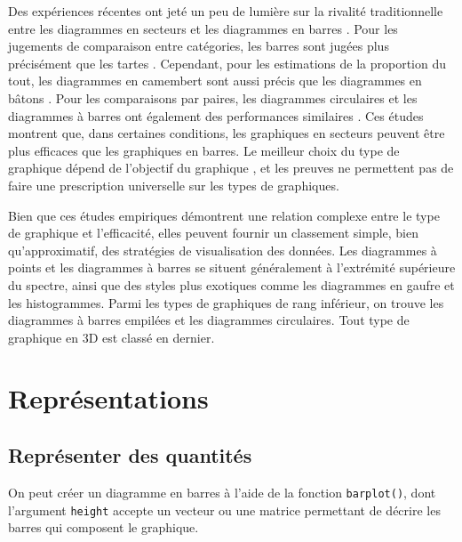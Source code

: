 \documentclass[
  french,
]{scrbook}
\begin{document}
Des expériences récentes ont jeté un peu de lumière sur la rivalité traditionnelle entre les diagrammes en secteurs et les diagrammes en barres \autocite{spence2005}. Pour les jugements de comparaison entre catégories, les barres sont jugées plus précisément que les tartes \autocite{feldman-stewart2000}. Cependant, pour les estimations de la proportion du tout, les diagrammes en camembert sont aussi précis que les diagrammes en bâtons \autocite{simkin1987,spence1990}. Pour les comparaisons par paires, les diagrammes circulaires et les diagrammes à barres ont également des performances similaires \autocite{spence1991,meyer1997}. Ces études montrent que, dans certaines conditions, les graphiques en secteurs peuvent être plus efficaces que les graphiques en barres. Le meilleur choix du type de graphique dépend de l'objectif du graphique \autocite{kosslyn1992}, et les preuves ne permettent pas de faire une prescription universelle sur les types de graphiques.

Bien que ces études empiriques démontrent une relation complexe entre le type de graphique et l'efficacité, elles peuvent fournir un classement simple, bien qu'approximatif, des stratégies de visualisation des données. Les diagrammes à points et les diagrammes à barres se situent généralement à l'extrémité supérieure du spectre, ainsi que des styles plus exotiques comme les diagrammes en gaufre et les histogrammes. Parmi les types de graphiques de rang inférieur, on trouve les diagrammes à barres empilées et les diagrammes circulaires. Tout type de graphique en 3D est classé en dernier.

\hypertarget{repruxe9sentations}{%
\chapter{Représentations}\label{repruxe9sentations}}

\hypertarget{graph-quantites}{%
\section{Représenter des quantités}\label{graph-quantites}}

On peut créer un diagramme en barres à l'aide de la fonction \texttt{barplot()}, dont l'argument \texttt{height} accepte un vecteur ou une matrice permettant de décrire les barres qui composent le graphique.
\end{document}
